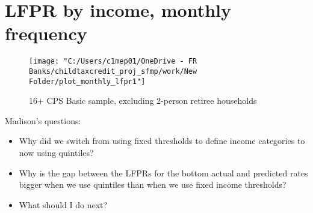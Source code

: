 \documentclass{article}
\begin{document}
	\section{LFPR by income, monthly frequency}
\begin{figure}[H]
	\centering
	\texttt{[image: "C:/Users/c1mep01/OneDrive - FR Banks/childtaxcredit\_proj\_sfmp/work/New Folder/plot\_monthly\_lfpr1"]}
	\caption{16+ CPS Basic sample, excluding 2-person retiree households}
	\label{fig:plotmonthlylfpr1}
\end{figure}
Madison's questions:
\begin{itemize}
	\item  Why did we switch from using fixed thresholds to define income categories to now using quintiles?
	\item 	Why is the gap between the LFPRs for the bottom actual and predicted rates bigger when we use quintiles than when we use fixed income thresholds? 
	\item What should I do next?
\end{itemize}
\end{document}
